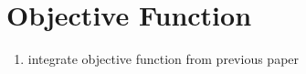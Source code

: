 \section{Objective Function}
\begin{enumerate}
	\item integrate objective function from previous paper 
\end{enumerate}
